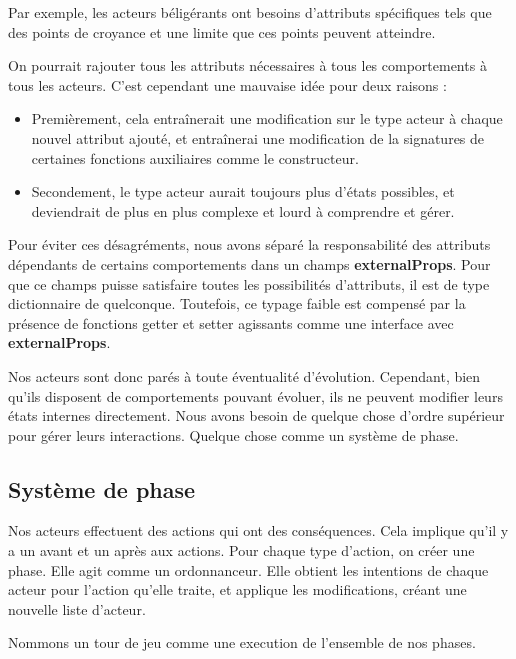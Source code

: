 \documentclass{article}
\begin{document}
Par exemple, les acteurs béligérants ont besoins d'attributs spécifiques tels que des points de croyance et une limite que ces points peuvent atteindre.

On pourrait rajouter tous les attributs nécessaires à tous les comportements 
à tous les acteurs. C'est cependant une mauvaise idée pour deux raisons :
\begin{itemize}
    \item Premièrement, cela entraînerait une modification sur le type acteur à chaque nouvel attribut ajouté, et entraînerai une modification de la signatures de certaines fonctions auxiliaires comme le constructeur.
    \item Secondement, le type acteur aurait toujours plus d'états possibles, 
et deviendrait de plus en plus complexe et lourd à comprendre et gérer.
\end{itemize}
\vspace{8px}
Pour éviter ces désagréments, nous avons séparé la responsabilité des attributs 
dépendants de certains comportements dans un champs \textbf{externalProps}.
Pour que ce champs puisse satisfaire toutes les possibilités d'attributs, il
est de type dictionnaire de quelconque. Toutefois, ce typage faible est compensé 
par la présence de fonctions getter et setter agissants comme une interface 
avec \textbf{externalProps}.

Nos acteurs sont donc parés à toute éventualité d'évolution.
Cependant, bien qu'ils disposent de comportements pouvant évoluer, ils ne peuvent modifier leurs 
états internes directement.
Nous avons besoin de quelque chose d'ordre supérieur pour gérer leurs interactions.
Quelque chose comme un système de phase.

\subsection{Système de phase}

Nos acteurs effectuent des actions qui ont des conséquences.
Cela implique qu'il y a un avant et un après aux actions.
Pour chaque type d'action, on créer une phase.
Elle agit comme un ordonnanceur. Elle obtient les intentions de chaque 
acteur pour l'action qu'elle traite, et applique les modifications, 
créant une nouvelle liste d'acteur.

Nommons un tour de jeu comme une execution de l'ensemble de nos phases.
\end{document}
